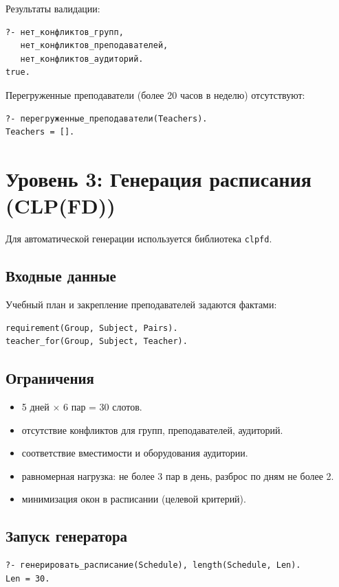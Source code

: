 \documentclass[14pt,a4paper]{extarticle}
\begin{document}
Результаты валидации:
\begin{verbatim}
?- нет_конфликтов_групп,
   нет_конфликтов_преподавателей,
   нет_конфликтов_аудиторий.
true.
\end{verbatim}

Перегруженные преподаватели (более 20 часов в неделю) отсутствуют:
\begin{verbatim}
?- перегруженные_преподаватели(Teachers).
Teachers = [].
\end{verbatim}

\section{Уровень 3: Генерация расписания (CLP(FD))}
Для автоматической генерации используется библиотека \texttt{clpfd}.

\subsection*{Входные данные}
Учебный план и закрепление преподавателей задаются фактами:
\begin{verbatim}
requirement(Group, Subject, Pairs).
teacher_for(Group, Subject, Teacher).
\end{verbatim}

\subsection*{Ограничения}
\begin{itemize}[leftmargin=1.25cm]
  \item 5 дней $\times$ 6 пар = 30 слотов.
  \item отсутствие конфликтов для групп, преподавателей, аудиторий.
  \item соответствие вместимости и оборудования аудитории.
  \item равномерная нагрузка: не более 3 пар в день, разброс по дням не более 2.
  \item минимизация окон в расписании (целевой критерий).
\end{itemize}

\subsection*{Запуск генератора}
\begin{verbatim}
?- генерировать_расписание(Schedule), length(Schedule, Len).
Len = 30.
\end{verbatim}
\end{document}
